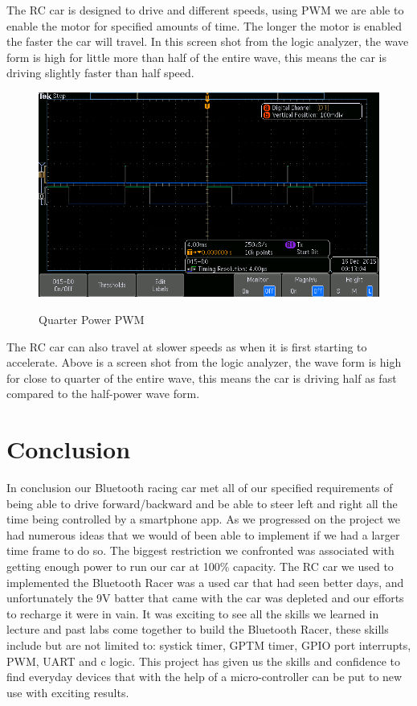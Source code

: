 \documentclass[12pt]{article}
\begin{document}
The RC car is designed to drive and different speeds, using PWM we are able to enable the motor for specified amounts of  time. The longer the motor is enabled the faster the car will travel. In this screen shot from the logic analyzer, the wave form is high for little more than half of the entire wave, this means the car is driving slightly faster than half speed.\\


\begin{figure}[H]
\begin {center}
\includegraphics[scale=.75]{quarter-power}\\
\caption{Quarter Power PWM}
\end {center}
\end{figure}

The RC car can also travel at slower speeds as when it is first starting to accelerate. Above is a screen shot from the logic analyzer, the wave form is high for close to quarter of the entire wave, this means the car is driving half as fast compared to the half-power wave form.\\

\section{Conclusion}
In conclusion our Bluetooth racing car met all of our specified requirements of being able to drive forward/backward and be able to steer left and right all the time being controlled by a smartphone app. As we progressed on the project we had numerous ideas that we would of been able to implement if we had a larger time frame to do so. The biggest restriction we confronted was associated with getting enough power to run our car at 100\% capacity. The RC car we used to implemented the Bluetooth Racer was a used car that had seen better days, and unfortunately the 9V batter that came with the car was depleted and our efforts to recharge it were in vain. It was exciting to see all the skills we learned in lecture and past labs come together to build the Bluetooth Racer, these skills include but are not limited to: systick timer, GPTM timer, GPIO port interrupts, PWM, UART and c logic. This project has given us the skills and confidence to find everyday devices that with the help of a micro-controller can be put to new use with exciting results.\\
\end{document}
